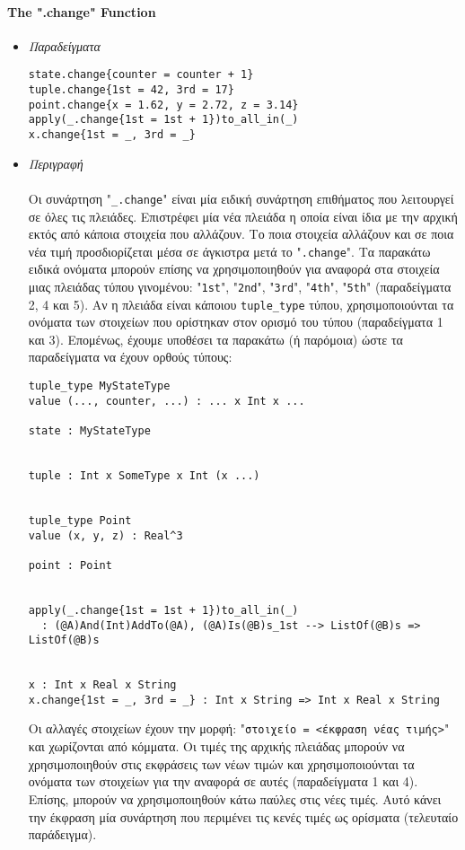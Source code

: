 \documentclass[diploma]{softlab-thesis}
\begin{document}
\paragraph{The ".change" Function}

\begin{itemize}

\item \textit{Παραδείγματα}

\begin{verbatim}
state.change{counter = counter + 1}
tuple.change{1st = 42, 3rd = 17}
point.change{x = 1.62, y = 2.72, z = 3.14}
apply(_.change{1st = 1st + 1})to_all_in(_)
x.change{1st = _, 3rd = _}
\end{verbatim}

\item \textit{Περιγραφή}
\\\\
Οι συνάρτηση "\verb|_.change|" είναι μία ειδική συνάρτηση επιθήματος που
λειτουργεί σε όλες τις πλειάδες. Επιστρέφει μία νέα πλειάδα η οποία είναι ίδια
με την αρχική εκτός από κάποια στοιχεία που αλλάζουν. Το ποια στοιχεία αλλάζουν
και σε ποια νέα τιμή προσδιορίζεται μέσα σε άγκιστρα μετά το "\verb|.change|".
Τα παρακάτω ειδικά ονόματα μπορούν επίσης να χρησιμοποιηθούν για αναφορά στα
στοιχεία μιας πλειάδας τύπου γινομένου: "\verb|1st|", "\verb|2nd|",
"\verb|3rd|", "\verb|4th|", "\verb|5th|" (παραδείγματα 2, 4 και 5). Αν η
πλειάδα είναι κάποιου \verb|tuple_type| τύπου, χρησιμοποιούνται τα ονόματα των
στοιχείων που ορίστηκαν στον ορισμό του τύπου (παραδείγματα 1 και 3).
Επομένως, έχουμε υποθέσει τα παρακάτω (ή παρόμοια) ώστε τα παραδείγματα να
έχουν ορθούς τύπους:

\begin{verbatim}
tuple_type MyStateType
value (..., counter, ...) : ... x Int x ...

state : MyStateType


tuple : Int x SomeType x Int (x ...)


tuple_type Point
value (x, y, z) : Real^3

point : Point


apply(_.change{1st = 1st + 1})to_all_in(_)
  : (@A)And(Int)AddTo(@A), (@A)Is(@B)s_1st --> ListOf(@B)s => ListOf(@B)s


x : Int x Real x String
x.change{1st = _, 3rd = _} : Int x String => Int x Real x String
\end{verbatim}

Οι αλλαγές στοιχείων έχουν την μορφή: "\verb|στοιχείο = <έκφραση νέας τιμής>|"
και χωρίζονται από κόμματα. Οι τιμές της αρχικής πλειάδας μπορούν να
χρησιμοποιηθούν στις εκφράσεις των νέων τιμών και χρησιμοποιούνται τα ονόματα
των στοιχείων για την αναφορά σε αυτές (παραδείγματα 1 και 4). Επίσης, μπορούν
να χρησιμοποιηθούν κάτω παύλες στις νέες τιμές. Αυτό κάνει την έκφραση μία
συνάρτηση που περιμένει τις κενές τιμές ως ορίσματα (τελευταίο παράδειγμα).

\end{itemize}
\end{document}
